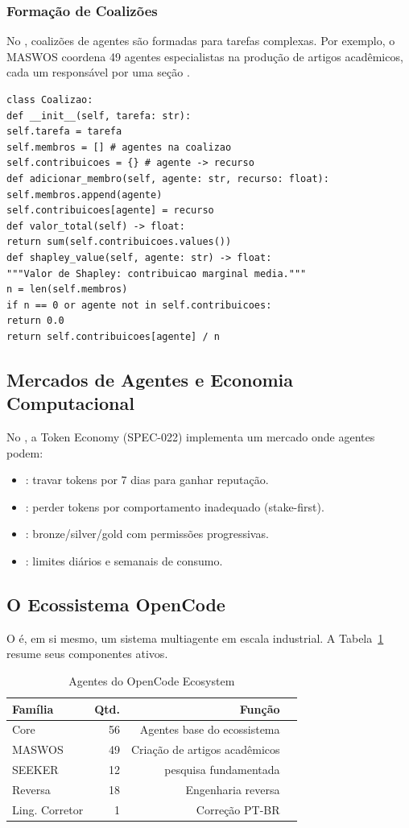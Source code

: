 \subsubsection*{Formação de Coalizões}
No \opencodeeco{}, coalizões de agentes são formadas para tarefas
complexas. Por exemplo, o MASWOS coordena 49 agentes especialistas na
produção de artigos acadêmicos, cada um responsável por uma seção
\cite{opencode2026maswos}.
\begin{lstlisting}[style=pythonstyle]
class Coalizao:
def __init__(self, tarefa: str):
self.tarefa = tarefa
self.membros = [] # agentes na coalizao
self.contribuicoes = {} # agente -> recurso
def adicionar_membro(self, agente: str, recurso: float):
self.membros.append(agente)
self.contribuicoes[agente] = recurso
def valor_total(self) -> float:
return sum(self.contribuicoes.values())
def shapley_value(self, agente: str) -> float:
"""Valor de Shapley: contribuicao marginal media."""
n = len(self.membros)
if n == 0 or agente not in self.contribuicoes:
return 0.0
return self.contribuicoes[agente] / n
\end{lstlisting}
\subsection{Mercados de Agentes e Economia Computacional}
No \opencodeeco{}, a Token Economy (SPEC-022) implementa um mercado onde
agentes podem:
\begin{itemize}
\item {}: travar tokens por 7 dias para ganhar reputação.
\item {}: perder tokens por comportamento inadequado
(stake-first).
\item {}: bronze/silver/gold com permissões progressivas.
\item {}: limites diários e semanais de consumo.
\end{itemize}
\cite{opencode2026token, opencode2026spec038}
\subsection{O Ecossistema OpenCode}
O \opencodeeco{} é, em si mesmo, um sistema multiagente em escala
industrial. A Tabela~\ref{tab:agentes-opencode} resume seus componentes
ativos.
\begin{table}[htb]
\centering
\caption{Agentes do OpenCode Ecosystem}
\label{tab:agentes-opencode}
\begin{tabular}{lrrl}
\toprule
\textbf{Família} & \textbf{Qtd.} & \textbf{Função} \\
\midrule
Core & 56 & Agentes base do ecossistema \\
MASWOS & 49 & Criação de artigos acadêmicos \\
SEEKER & 12 & pesquisa fundamentada \\
Reversa & 18 & Engenharia reversa \\
Ling. Corretor & 1 & Correção PT-BR \\
\bottomrule
\end{tabular}
\end{table}
